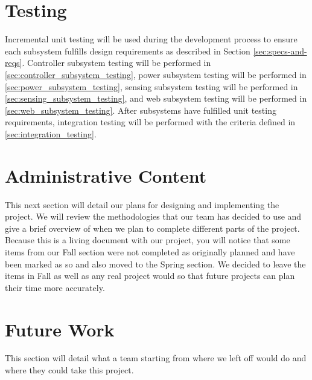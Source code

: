 \documentclass[12pt]{article}
\begin{document}
\section{Testing}                               %
Incremental unit testing will be used during the development process
to ensure each subsystem fulfills design requirements as described in
Section \ref{sec:specs-and-reqs}. Controller subsystem testing will be performed in
\autoref{sec:controller_subsystem_testing}, power subsystem testing will be
performed in \autoref{sec:power_subsystem_testing}, sensing subsystem testing
will be performed in \autoref{sec:sensing_subsystem_testing}, and web subsystem
testing will be performed in \autoref{sec:web_subsystem_testing}. After
subsystems have fulfilled unit testing requirements, integration testing will
be performed with the criteria defined in \autoref{sec:integration_testing}.
\section{Administrative Content}                %
This next section will detail our plans for designing and implementing the project. We will review the methodologies that our team has decided to use and give a brief overview of when we plan to complete different parts of the project. Because this is a living document with our project, you will notice that some items from our Fall section were not completed as originally planned and have been marked as so and also moved to the Spring section. We decided to leave the items in Fall as well as any real project would so that future projects can plan their time more accurately. 
\section{Future Work}
This section will detail what a team starting from where we left off would do and where they could take this project.

\clearpage
{}
\end{document}
